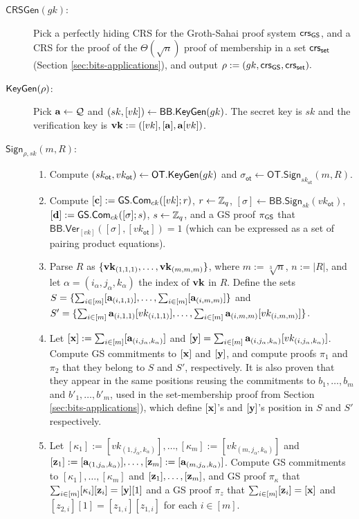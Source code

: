 \begin{description}
\item[$\mathsf{CRSGen}(gk)$:] Pick a perfectly hiding CRS for the Groth-Sahai proof system $\mathsf{crs}_{\mathsf{GS}}$, and a CRS for the proof of the $\Theta(\sqrt{n})$ proof of membership in a set $\mathsf{crs}_{\mathsf{set}}$ (Section \ref{sec:bits-applications}), and output $\rho:=(gk,\mathsf{crs}_{\mathsf{GS}},\mathsf{crs}_{\mathsf{set}}).$
\item[$\mathsf{KeyGen}(\rho)$:] Pick $\mathbf{a}\gets\mathcal{Q}$ and $(sk,[vk])\gets\mathsf{BB}.\mathsf{KeyGen}(gk)$. The secret key is $sk$ and the verification key is $\mathbf{vk}:=([vk],[\mathbf{a}],\mathbf{a}[vk])$.
\item[$\mathsf{Sign}_{\rho,sk}(m,R)$:]
\begin{enumerate}
\item Compute $(sk_\mathsf{ot},vk_\mathsf{ot})\gets\mathsf{OT}.\mathsf{KeyGen}(gk)$ and $\sigma_\mathsf{ot}\gets\allowbreak\mathsf{OT}.\mathsf{Sign}_{sk_\mathsf{ot}}(m,R)$.
\item Compute $[\mathbf{c}]:={\mathsf{GS}}.\mathsf{Com}_{ck}([vk];r)$, $r\gets\mathbb{Z}_q$, $[\sigma]\gets\mathsf{BB}.\mathsf{Sign}_{sk}(vk_\mathsf{ot})$, $[\mathbf{d}]:={\mathsf{GS}}.\mathsf{Com}_{ck}([\sigma];s)$, $s\gets\mathbb{Z}_q$, and a GS proof $\pi_{\mathsf{GS}}$ that $\mathsf{BB}.\mathsf{Ver}_{[vk]}(\allowbreak[\sigma],[vk_\mathsf{ot}])=1$ (which can be expressed as a set of pairing product equations).
\item Parse $R$ as $\{\mathbf{vk}_{(1,1,1)},\ldots,\mathbf{vk}_{(m,m,m)}\}$, where $m:=\sqrt[3]{n}$, $n:=|R|$, and let $\alpha=(i_\alpha,j_\alpha,k_\alpha)$ the index of $\mathbf{vk}$ in $R$. Define the sets $S=\{\sum_{i\in[m]}[\mathbf{a}_{(i,1,1)}],\allowbreak\ldots,\sum_{i\in[m]}[\mathbf{a}_{(i,m,m)}]\}$ and $S'=\{\sum_{i\in[m]}\mathbf{a}_{(i,1,1)}[vk_{(i,1,1)}],\allowbreak\ldots,\sum_{i\in[m]}\mathbf{a}_{(i,m,m)}[vk_{(i,m,m)}]\}$.
\item Let $[\mathbf{x}]:=\sum_{i\in[m]}[\mathbf{a}_{(i,j_\alpha,k_\alpha)}]$ and $[\mathbf{y}]=\sum_{i\in[m]}\mathbf{a}_{(i,j_\alpha,k_\alpha)}[vk_{(i,j_\alpha,k_\alpha)}]$. Compute GS commitments to $[\mathbf{x}]$ and $[\mathbf{y}]$, and compute proofs $\pi_1$ and $\pi_2$ that they belong to $S$ and $S'$, respectively. It is also proven that they appear in the same positions reusing the commitments to $b_1,\ldots,b_{m}$ and $b'_1,\ldots,b'_{m}$, used in the set-membership proof from Section \ref{sec:bits-applications}), which define $[\mathbf{x}]$'s and $[\mathbf{y}]$'s position in $S$ and $S'$ respectively.
\item Let $[\kappa_1]:=[vk_{(1,j_\alpha,k_\alpha)}],\ldots,[\kappa_m]:=[vk_{(m,j_\alpha,k_\alpha)}]$ and $[\mathbf{z}_1]:=[\mathbf{a}_{(1,j_\alpha,k_\alpha)}],\allowbreak\ldots,[\mathbf{z}_m]:=[\mathbf{a}_{(m,j_\alpha,k_\alpha)}]$. Compute GS commitments to $[\kappa_1],\ldots,[\kappa_m]$ and $[\mathbf{z}_1],\ldots,[\mathbf{z}_m]$, and GS proof $\pi_\kappa$ that $\sum_{i\in[m]}[\kappa_i][\mathbf{z}_i]=[\mathbf{y}][1]$ and a GS proof $\pi_{z}$ that $\sum_{i\in[m]}[\mathbf{z}_i]=[\mathbf{x}]$ and $[z_{2,i}][1]=[z_{1,i}][z_{1,i}]$ for each $i\in[m]$.

\end{enumerate}
\end{description}
